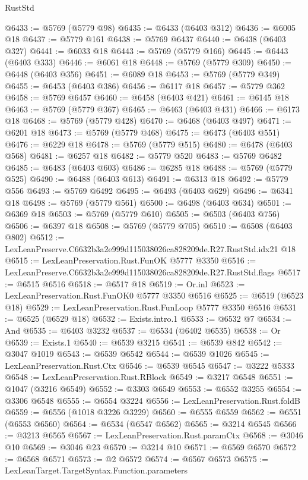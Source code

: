 \begin{lexlean}{RustStd}
\begin{coremodule}
@6433 := @5769 (@5779 @98)
@6435 := @6433 (@6403 @312)
@6436 := @6005 @18
@6437 := @5779 @161
@6438 := @5769 @6437
@6440 := @6438 (@6403 @327)
@6441 := @6033 @18
@6443 := @5769 (@5779 @166)
@6445 := @6443 (@6403 @333)
@6446 := @6061 @18
@6448 := @5769 (@5779 @309)
@6450 := @6448 (@6403 @356)
@6451 := @6089 @18
@6453 := @5769 (@5779 @349)
@6455 := @6453 (@6403 @386)
@6456 := @6117 @18
@6457 := @5779 @362
@6458 := @5769 @6457
@6460 := @6458 (@6403 @421)
@6461 := @6145 @18
@6463 := @5769 (@5779 @367)
@6465 := @6463 (@6403 @431)
@6466 := @6173 @18
@6468 := @5769 (@5779 @428)
@6470 := @6468 (@6403 @497)
@6471 := @6201 @18
@6473 := @5769 (@5779 @468)
@6475 := @6473 (@6403 @551)
@6476 := @6229 @18
@6478 := @5769 (@5779 @515)
@6480 := @6478 (@6403 @568)
@6481 := @6257 @18
@6482 := @5779 @520
@6483 := @5769 @6482
@6485 := @6483 (@6403 @603)
@6486 := @6285 @18
@6488 := @5769 (@5779 @525)
@6490 := @6488 (@6403 @613)
@6491 := @6313 @18
@6492 := @5779 @556
@6493 := @5769 @6492
@6495 := @6493 (@6403 @629)
@6496 := @6341 @18
@6498 := @5769 (@5779 @561)
@6500 := @6498 (@6403 @634)
@6501 := @6369 @18
@6503 := @5769 (@5779 @610)
@6505 := @6503 (@6403 @756)
@6506 := @6397 @18
@6508 := @5769 (@5779 @705)
@6510 := @6508 (@6403 @802)
@6512 := LexLeanPreserve.C6632b3a2e999d115038026ca828209de.R27.RustStd.idx21 @18
@6515 := LexLeanPreservation.Rust.FunOK @5777 @3350
@6516 := LexLeanPreserve.C6632b3a2e999d115038026ca828209de.R27.RustStd.flags
@6517 := @6515 @6516
@6518 := @6517 @18
@6519 := Or.inl
@6523 := LexLeanPreservation.Rust.FunOK0 @5777 @3350 @6516
@6525 := @6519 (@6523 @18)
@6529 := LexLeanPreservation.Rust.FunLoop @5777 @3350 @6516
@6531 := @6525 (@6529 @18)
@6532 := Exists.intro.{1}
@6533 := @6532 @7
@6534 := And
@6535 := @6403 @3232
@6537 := @6534 (@6402 @6535)
@6538 := Or
@6539 := Exists.{1}
@6540 := @6539 @3215
@6541 := @6539 @842
@6542 := @3047 @1019
@6543 := @6539 @6542
@6544 := @6539 @1026
@6545 := LexLeanPreservation.Rust.Ctx
@6546 := @6539 @6545
@6547 := @3222 @5333
@6548 := LexLeanPreservation.Rust.RBlock
@6549 := @3217 @6548
@6551 := @1047 (@3216 @6549)
@6552 := @3303 @6549
@6553 := @6552 @3255
@6554 := @3306 @6548
@6555 := @6554 @3224
@6556 := LexLeanPreservation.Rust.foldB
@6559 := @6556 (@1018 @3226 @3229)
@6560 := @6555 @6559
@6562 := @6551 (@6553 @6560)
@6564 := @6534 (@6547 @6562)
@6565 := @3214 @6545
@6566 := @3213 @6565
@6567 := LexLeanPreservation.Rust.paramCtx
@6568 := @3046 @10
@6569 := @3046 @23
@6570 := @3214 @10
@6571 := @6569 @6570
@6572 := @6568 @6571
@6573 := @2 @6572
@6574 := @6567 @6573
@6575 := LexLeanTarget.TargetSyntax.Function.parameters

\end{coremodule}
\end{lexlean}
